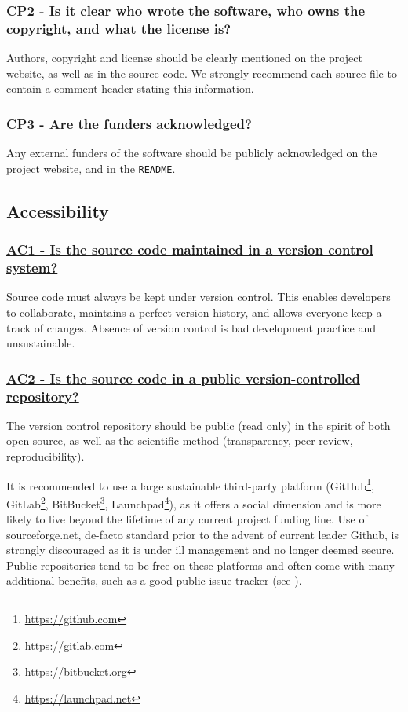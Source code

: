 \documentclass[a4paper,11pt]{article}
\newcommand{\criterion}[2]{\subsubsection*{\underline{#1 - #2}}\label{id:#1}}
\newcommand\CheckTable{%
  \begin{tabular}{ccccc}
    No & Minimal & Adequate & Good & Perfect \\
    0 & 1 & 2 & 3 & 4 \\
    \hline
    $\square$ & $\square$ & $\square$ & $\square$ & $\square$ \\
  \end{tabular}%
}
\newcommand{\refcrit}[1]{%
 \framebox[1.1\width]{\hyperref[id:#1]{#1}}
}
\begin{document}
\newcommand{\cpTwoID}{CP2}
\newcommand{\cpTwoText}{Is it clear who wrote the software, who owns the copyright, and what the license is?}
\criterion{\cpTwoID}{\cpTwoText}

Authors, copyright and license should be clearly mentioned on the project
website, as well as in the source code.  We strongly recommend each source file to contain a comment header stating this information.


\newcommand{\cpThreeID}{CP3}
\newcommand{\cpThreeText}{Are the funders acknowledged?}
\criterion{\cpThreeID}{\cpThreeText}

Any external funders of the software should be publicly acknowledged on the project
website, and in the \texttt{README}.


\subsection{Accessibility}\label{sec:acc}

\newcommand{\acOneID}{AC1}
\newcommand{\acOneText}{Is the source code maintained in a version control system?}
\criterion{\acOneID}{\acOneText}

Source code must always be kept under version control. This enables developers
to collaborate, maintains a perfect version history, and allows everyone keep a
track of changes. Absence of version control is bad development practice and
unsustainable.


\newcommand{\acTwoID}{AC2}
\newcommand{\acTwoText}{Is the source code in a public version-controlled repository?}
\criterion{\acTwoID}{\acTwoText}

The version control repository should be public (read only) in the spirit of both open
source, as well as the scientific method (transparency, peer review,
reproducibility). 

It is recommended to use a large sustainable third-party platform
(GitHub\footnote{\url{https://github.com}},
GitLab\footnote{\url{https://gitlab.com}},
BitBucket\footnote{\url{https://bitbucket.org}},
Launchpad\footnote{\url{https://launchpad.net}}), as it offers a social
dimension and is more likely to live beyond the lifetime of any current project
funding line. Use of sourceforge.net, de-facto standard prior to the advent of
current leader Github, is strongly discouraged as it is under ill management
and no longer deemed secure. Public repositories tend to be free on these platforms and
often come with many additional benefits, such as a good public issue tracker
(see \refcrit{SP2}).
\end{document}
